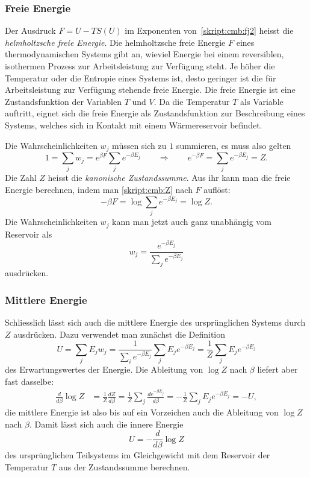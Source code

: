 \subsubsection{Freie Energie}
Der Ausdruck $F=U-TS(U)$ im Exponenten von~\eqref{skript:cmb:fj2}
heisst die {\em helmholtzsche freie Energie}.
Die helmholtzsche freie Energie $F$ eines thermodynamischen Systems
gibt an, wieviel Energie bei einem reversiblen, isothermen Prozess zur
Arbeitsleistung zur Verfügung steht. 
Je höher die Temperatur oder die Entropie eines Systems ist, desto geringer
ist die für Arbeitsleistung zur Verfügung stehende freie Energie.
Die freie Energie ist eine Zustandsfunktion der Variablen $T$ und $V$.
Da die Temperatur $T$ als Variable auftritt, eignet sich die freie
Energie als Zustandsfunktion zur Beschreibung eines Systems, welches
sich in Kontakt mit einem Wärmereservoir befindet.

Die Wahrscheinlichkeiten $w_j$ müssen sich zu $1$ summieren, es muss also
gelten
\begin{equation}
1=\sum_{j} w_j = e^{\beta F}\sum_j e^{-\beta E_j}
\qquad
\Rightarrow
\qquad
e^{-\beta F}=\sum_je^{-\beta E_j}=Z.
\label{skript:cmb:Z}
\end{equation}
Die Zahl $Z$ heisst die {\em kanonische Zustandssumme}.
Aus ihr kann man die freie Energie berechnen, indem man
\eqref{skript:cmb:Z} nach $F$ auflöst:
\begin{equation}
-\beta F=\log\sum_j e^{-\beta E_j} = \log Z.
\end{equation}
Die Wahrscheinlichkeiten $w_j$ kann man jetzt auch ganz unabhängig vom
Reservoir als
\begin{equation}
w_j
=
\frac{e^{-\beta E_j}}{\sum_j e^{-\beta E_j}}
\end{equation}
ausdrücken.

\subsubsection{Mittlere Energie}
Schliesslich lässt sich auch die mittlere Energie des ursprünglichen
Systems durch $Z$ ausdrücken.
Dazu verwendet man zunächst die Definition 
\[
U
=
\sum_j E_jw_j
=
\frac{1}{\sum_i e^{-\beta E_j}}
\sum_j E_je^{-\beta E_j}
=
\frac1Z \sum_j E_je^{-\beta E_j}
\]
des Erwartungswertes der Energie.
Die Ableitung von $\log Z$ nach $\beta$ liefert aber fast dasselbe:
\begin{align*}
\frac{d}{d\beta} \log Z
&=
\frac1{Z}\frac{dZ}{d\beta}
=
\frac1{Z}\sum_j\frac{de^{-\beta E_j}}{d\beta}
=
-\frac1Z\sum_j E_je^{-\beta E_j}
=
-U,
\end{align*}
die mittlere Energie ist also bis auf ein Vorzeichen auch die Ableitung
von $\log Z$ nach $\beta$.
Damit lässt sich auch die innere Energie
\[
U=-\frac{d}{d\beta}\log Z
\]
des ursprünglichen Teilsystems im Gleichgewicht mit dem Reservoir der
Temperatur $T$ aus der Zustandssumme berechnen.

